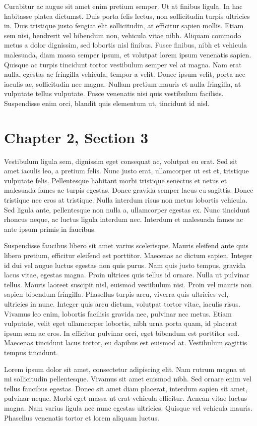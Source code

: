 Curabitur ac augue sit amet enim pretium semper. Ut at finibus ligula. In hac habitasse platea dictumst. Duis porta felis lectus, non sollicitudin turpis ultricies in. Duis tristique justo feugiat elit sollicitudin, at efficitur sapien mollis. Etiam sem nisi, hendrerit vel bibendum non, vehicula vitae nibh. Aliquam commodo metus a dolor dignissim, sed lobortis nisl finibus. Fusce finibus, nibh et vehicula malesuada, diam massa semper ipsum, et volutpat lorem ipsum venenatis sapien. Quisque ac turpis tincidunt tortor vestibulum semper vel at magna. Nam erat nulla, egestas ac fringilla vehicula, tempor a velit. Donec ipsum velit, porta nec iaculis ac, sollicitudin nec magna. Nullam pretium mauris et nulla fringilla, at vulputate tellus vulputate. Fusce venenatis nisi quis vestibulum facilisis. Suspendisse enim orci, blandit quis elementum ut, tincidunt id nisl.

\newpage

\section{Chapter 2, Section 3}

Vestibulum ligula sem, dignissim eget consequat ac, volutpat eu erat. Sed sit amet iaculis leo, a pretium felis. Nunc justo erat, ullamcorper ut est et, tristique vulputate felis. Pellentesque habitant morbi tristique senectus et netus et malesuada fames ac turpis egestas. Donec gravida semper lacus eu sagittis. Donec tristique nec eros at tristique. Nulla interdum risus non metus lobortis vehicula. Sed ligula ante, pellentesque non nulla a, ullamcorper egestas ex. Nunc tincidunt rhoncus neque, ac luctus ligula interdum nec. Interdum et malesuada fames ac ante ipsum primis in faucibus.

Suspendisse faucibus libero sit amet varius scelerisque. Mauris eleifend ante quis libero pretium, efficitur eleifend est porttitor. Maecenas ac dictum sapien. Integer id dui vel augue luctus egestas non quis purus. Nam quis justo tempus, gravida lacus vitae, egestas magna. Proin ultrices quis tellus id ornare. Nulla ut pulvinar tellus. Mauris laoreet suscipit nisl, euismod vestibulum nisi. Proin vel mauris non sapien bibendum fringilla. Phasellus turpis arcu, viverra quis ultricies vel, ultricies in nunc. Integer quis arcu dictum, volutpat tortor vitae, iaculis risus. Vivamus leo enim, lobortis facilisis gravida nec, pulvinar nec metus. Etiam vulputate, velit eget ullamcorper lobortis, nibh urna porta quam, id placerat ipsum sem ac eros. In efficitur pulvinar orci, eget bibendum est porttitor sed. Maecenas tincidunt lacus tortor, eu dapibus est euismod at. Vestibulum sagittis tempus tincidunt. 


Lorem ipsum dolor sit amet, consectetur adipiscing elit. Nam rutrum magna ut mi sollicitudin pellentesque. Vivamus sit amet euismod nibh. Sed ornare enim vel tellus faucibus egestas. Donec sit amet diam placerat, interdum sapien sit amet, pulvinar neque. Morbi eget massa ut erat vehicula efficitur. Aenean vitae luctus magna. Nam varius ligula nec nunc egestas ultricies. Quisque vel vehicula mauris. Phasellus venenatis tortor et lorem aliquam luctus.